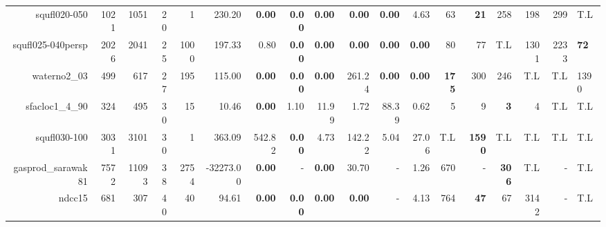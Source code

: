 \begin{table*}[t]
\begin{tabular}{|r|r|r|r|r||r||r|r|r|r|r||r|r|r|r|r|r|}
                      squfl020-050 &         1021 &          1051 &           20 &             1 &              230.20 &  \textbf{0.00} &  \textbf{0.00} &  \textbf{0.00} &  \textbf{0.00} &  \textbf{0.00} &           4.63 &                 63 &        \textbf{21} &                258 &                198 &          299 &          T.L \\ 
                 squfl025-040persp &         2026 &          2041 &           25 &          1000 &              197.33 &           0.80 &  \textbf{0.00} &  \textbf{0.00} &  \textbf{0.00} &  \textbf{0.00} &  \textbf{0.00} &                 80 &                 77 &                T.L &               1301 &         2233 &  \textbf{72} \\ 
                      waterno2\_03 &          499 &           617 &           27 &           195 &              115.00 &  \textbf{0.00} &  \textbf{0.00} &  \textbf{0.00} &         261.24 &  \textbf{0.00} &  \textbf{0.00} &       \textbf{175} &                300 &                246 &                T.L &          T.L &         1390 \\ 
                   sfacloc1\_4\_90 &          324 &           495 &           30 &            15 &               10.46 &  \textbf{0.00} &           1.10 &          11.99 &           1.72 &          88.39 &           0.62 &                  5 &                  9 &         \textbf{3} &                  4 &          T.L &          T.L \\ 
                      squfl030-100 &         3031 &          3101 &           30 &             1 &              363.09 &         542.82 &  \textbf{0.00} &           4.73 &         142.22 &           5.04 &          27.06 &                T.L &      \textbf{1590} &                T.L &                T.L &          T.L &          T.L \\ 
                gasprod\_sarawak81 &         7572 &         11093 &           38 &          2754 &           -32273.00 &  \textbf{0.00} &              - &  \textbf{0.00} &          30.70 &              - &           1.26 &                670 &                  - &       \textbf{306} &                T.L &            - &          T.L \\ 
                            ndcc15 &          681 &           307 &           40 &            40 &               94.61 &  \textbf{0.00} &  \textbf{0.00} &  \textbf{0.00} &  \textbf{0.00} &              - &           4.13 &                764 &        \textbf{47} &                 67 &               3142 &            - &          T.L \\ 

\end{tabular}
\end{table*}
